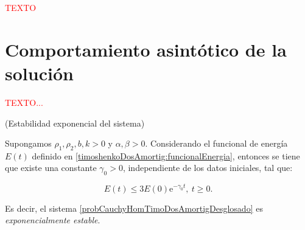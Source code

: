\textcolor{red}{TEXTO}

\section{Comportamiento asintótico de la solución}
\label{ch:TimoshenkoFric:section:compAsintotico}

\textcolor{red}{TEXTO...}

\begin{Teorema}{(Estabilidad exponencial del sistema)}
\label{ch:TimoshenkoFric:th:compExponencial}

    Supongamos $\rho_1, \rho_2, b, k > 0$ y $\alpha, \beta > 0$. Considerando el funcional de energía $E(t)$ definido en \eqref{timoshenkoDosAmortig:funcionalEnergia}, entonces se tiene que existe una constante $\gamma_0 > 0$, independiente de los datos iniciales, tal que:

    \[E(t) \leq 3E(0)\mathrm{e}^{-\gamma_0t}, \ t \geq 0.\]

    Es decir, el sistema \eqref{probCauchyHomTimoDosAmortigDesglosado} es \textit{exponencialmente estable}.
\end{Teorema}

